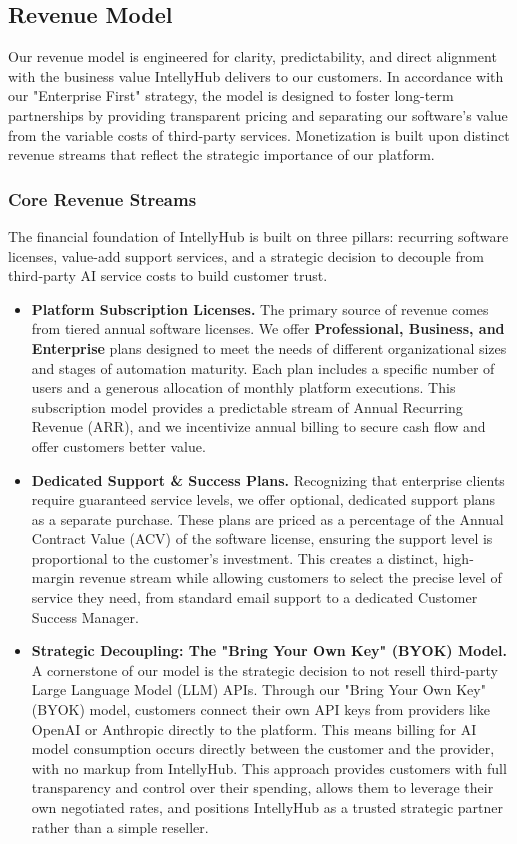 \documentclass[11pt, a4paper, oneside]{article}
\begin{document}
\subsection{Revenue Model}
Our revenue model is engineered for clarity, predictability, and direct alignment with the business value IntellyHub delivers to our customers. In accordance with our "Enterprise First" strategy, the model is designed to foster long-term partnerships by providing transparent pricing and separating our software's value from the variable costs of third-party services. Monetization is built upon distinct revenue streams that reflect the strategic importance of our platform.

\subsubsection{Core Revenue Streams}
The financial foundation of IntellyHub is built on three pillars: recurring software licenses, value-add support services, and a strategic decision to decouple from third-party AI service costs to build customer trust.

\begin{itemize}
    \item \textbf{Platform Subscription Licenses.} The primary source of revenue comes from tiered annual software licenses. We offer \textbf{Professional, Business, and Enterprise} plans designed to meet the needs of different organizational sizes and stages of automation maturity. Each plan includes a specific number of users and a generous allocation of monthly platform executions. This subscription model provides a predictable stream of Annual Recurring Revenue (ARR), and we incentivize annual billing to secure cash flow and offer customers better value.

    \item \textbf{Dedicated Support \& Success Plans.} Recognizing that enterprise clients require guaranteed service levels, we offer optional, dedicated support plans as a separate purchase. These plans are priced as a percentage of the Annual Contract Value (ACV) of the software license, ensuring the support level is proportional to the customer's investment. This creates a distinct, high-margin revenue stream while allowing customers to select the precise level of service they need, from standard email support to a dedicated Customer Success Manager.

    \item \textbf{Strategic Decoupling: The "Bring Your Own Key" (BYOK) Model.} A cornerstone of our model is the strategic decision to not resell third-party Large Language Model (LLM) APIs. Through our "Bring Your Own Key" (BYOK) model, customers connect their own API keys from providers like OpenAI or Anthropic directly to the platform. This means billing for AI model consumption occurs directly between the customer and the provider, with no markup from IntellyHub. This approach provides customers with full transparency and control over their spending, allows them to leverage their own negotiated rates, and positions IntellyHub as a trusted strategic partner rather than a simple reseller.
\end{itemize}
\end{document}
